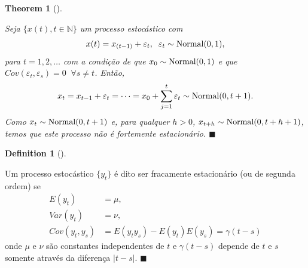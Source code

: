 \documentclass[
  letterpaper,
  DIV=11,
  numbers=noendperiod]{scrreprt}
\theoremstyle{plain}
\newtheorem{theorem}{Theorem}[chapter]
\theoremstyle{definition}
\theoremstyle{definition}
\newtheorem{definition}{Definition}[chapter]
\theoremstyle{remark}
\begin{document}
\begin{theorem}[]\protect\hypertarget{thm-exm_estacionaria2}{}\label{thm-exm_estacionaria2}

Seja \(\{x(t),t\in\mathbb{N}\}\) um processo estocástico com
\[x(t)= x_{(t-1)}+\varepsilon_t,\;\;\varepsilon_t\sim\hbox{Normal}(0,1),\]
para \(t=1,2,\ldots\) com a condição de que
\(x_0\sim\hbox{Normal}(0,1)\) e que
\(Cov(\varepsilon_t,\varepsilon_s)=0\;\;\forall s\neq t\). Então,
\[x_t=x_{t-1}+\varepsilon_{t}=\cdots=x_0+\sum_{j=1}^t\varepsilon_t\sim\hbox{Normal}(0,t+1).\]
Como \(x_t\sim\hbox{Normal}(0,t+1)\) e, para qualquer \(h>0\),
\(x_{t+h}\sim\hbox{Normal}(0,t+h+1)\), temos que este processo não é
fortemente estacionário. \(\blacksquare\)

\end{theorem}

\begin{definition}[]\protect\hypertarget{def-fracamente}{}\label{def-fracamente}

Um processo estocástico \(\{y_t\}\) é dito ser fracamente estacionário
(ou de segunda ordem) se \[\begin{align*}
    E(y_t)&=\mu,\\
    Var(y_t)&=\nu,\\ 
    Cov(y_t,y_s)&=E(y_ty_s)-E(y_t)E(y_s)=\gamma(t-s)
    \end{align*}\] onde \(\mu\) e \(\nu\) são constantes independentes
de \(t\) e \(\gamma(t-s)\) depende de \(t\) e \(s\) somente através da
diferença \(|t-s|\). \(\blacksquare\)

\end{definition}
\end{document}
